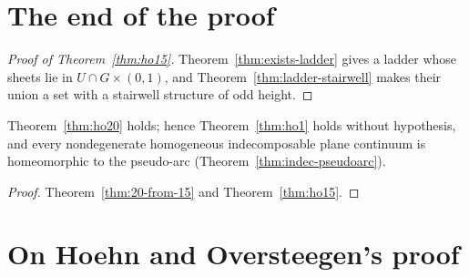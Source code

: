 
\section{The end of the proof}

\begin{proof}[Proof of Theorem~\ref{thm:ho15}]
Theorem~\ref{thm:exists-ladder} gives a ladder whose sheets lie in $U\cap G\times(0,1)$, and Theorem~\ref{thm:ladder-stairwell} makes their union a set with a stairwell structure of odd height.
\end{proof}


\begin{corollary}\label{cor:final}
Theorem~\ref{thm:ho20} holds; hence Theorem~\ref{thm:ho1} holds without hypothesis, and every nondegenerate homogeneous indecomposable plane continuum is homeomorphic to the
pseudo-arc (Theorem~\ref{thm:indec-pseudoarc}).
\end{corollary}

\begin{proof}
Theorem~\ref{thm:20-from-15} and Theorem~\ref{thm:ho15}.
\end{proof}


\section{On Hoehn and Oversteegen's proof}

